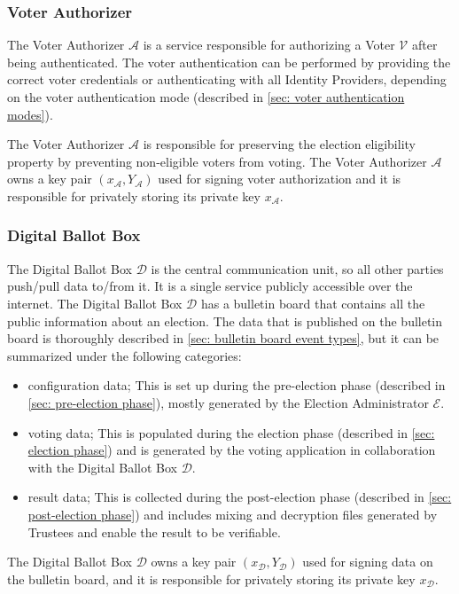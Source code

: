 \subsubsection{Voter Authorizer} 
The Voter Authorizer $\mathcal{A}$ is a service responsible for authorizing a Voter $\mathcal{V}$ after being authenticated. The voter authentication can be performed by providing the correct voter credentials or authenticating with all Identity Providers, depending on the voter authentication mode (described in \cref{sec: voter authentication modes}).

The Voter Authorizer $\mathcal{A}$ is responsible for preserving the election eligibility property by preventing non-eligible voters from voting. The Voter Authorizer $\mathcal{A}$ owns a key pair $(x_\mathcal{A}, Y_\mathcal{A})$ used for signing voter authorization and it is responsible for privately storing its private key $x_\mathcal{A}$.


\subsubsection{Digital Ballot Box} 
The Digital Ballot Box $\mathcal{D}$ is the central communication unit, so all other parties push/pull data to/from it. It is a single service publicly accessible over the internet. The Digital Ballot Box $\mathcal{D}$ has a bulletin board that contains all the public information about an election. The data that is published on the bulletin board is thoroughly described in \cref{sec: bulletin board event types}, but it can be summarized under the following categories: 
\begin{itemize}
    \item configuration data; This is set up during the pre-election phase (described in \cref{sec: pre-election phase}), mostly generated by the Election Administrator $\mathcal{E}$.
    \item voting data;  This is populated during the election phase (described in \cref{sec: election phase}) and is generated by the voting application in collaboration with the Digital Ballot Box $\mathcal{D}$.
    \item result data; This is collected during the post-election phase (described in \cref{sec: post-election phase}) and includes mixing and decryption files generated by Trustees and enable the result to be verifiable.
\end{itemize}

The Digital Ballot Box $\mathcal{D}$ owns a key pair $(x_\mathcal{D}, Y_\mathcal{D})$ used for signing data on the bulletin board, and it is responsible for privately storing its private key $x_\mathcal{D}$.


